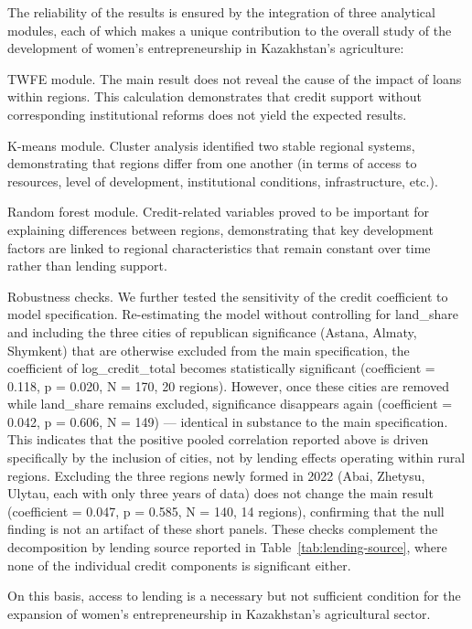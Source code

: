 ﻿\documentclass[pdflatex,sn-mathphys-ay]{sn-jnl}
\newif\ifrevmarks
\newcommand{\rev}[1]{\ifrevmarks\textcolor{red}{#1}\else#1\fi}
\begin{document}
The reliability of the results is ensured by the integration of three
analytical modules, each of which makes a unique contribution to the
overall study of the development of women's entrepreneurship in
Kazakhstan's agriculture:

TWFE module. The main result does not reveal the cause of the impact of
loans within regions. This calculation demonstrates that credit support
without corresponding institutional reforms does not yield the expected
results.

K-means module. Cluster analysis identified two stable regional systems,
demonstrating that regions differ from one another (in terms of access
to resources, level of development, institutional conditions,
infrastructure, etc.).

Random forest module. Credit-related variables proved to be important
for explaining differences between regions, demonstrating that key
development factors are linked to regional characteristics that remain
constant over time rather than lending support.

\rev{Robustness checks. We further tested the sensitivity of the credit
coefficient to model specification. Re-estimating the model without
controlling for land\_share and including the three cities of
republican significance (Astana, Almaty, Shymkent) that are otherwise
excluded from the main specification, the coefficient of
log\_credit\_total becomes statistically significant (coefficient =
0.118, p = 0.020, N = 170, 20 regions). However, once these cities are
removed while land\_share remains excluded, significance disappears
again (coefficient = 0.042, p = 0.606, N = 149) --- identical in
substance to the main specification. This indicates that the positive
pooled correlation reported above is driven specifically by the
inclusion of cities, not by lending effects operating within rural
regions. Excluding the three regions newly formed in 2022 (Abai,
Zhetysu, Ulytau, each with only three years of data) does not change
the main result (coefficient = 0.047, p = 0.585, N = 140, 14 regions),
confirming that the null finding is not an artifact of these short
panels. These checks complement the decomposition by lending source
reported in Table~\ref{tab:lending-source}, where none of the
individual credit components is significant either.}

On this basis, access to lending is a necessary but not sufficient
condition for the expansion of women's entrepreneurship in Kazakhstan's
agricultural sector.
\end{document}
